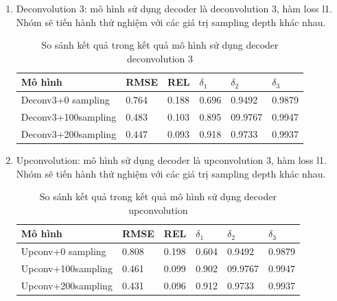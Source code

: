 \begin{enumerate}
\item Deconvolution 3: mô hình sử dụng decoder là  deconvolution 3, hàm loss l1. Nhóm sẽ tiến hành thử nghiệm với các giá trị sampling depth khác nhau. 
\begin{table}[H]
\centering
\begin{tabular}{ |p{4cm}|p{2.5cm}|p{2cm}|p{1cm}|p{1cm}|p{1cm}|   }
\hline
Mô hình & RMSE &  REL & $\delta_1$ & $\delta_2$ & $\delta_3$ \\
\hline
Deconv3+0 sampling & 0.764 & 0.188 & 0.696 & 0.9492 & 0.9879 \\
\hline
Deconv3+100sampling & 0.483 &  0.103  & 0.895 & 09.9767 & 0.9947\\
\hline
Deconv3+200sampling & 0.447 & 0.093 & 0.918 & 0.9733 & 0.9937 \\
\hline
\end{tabular}
\caption{So sánh kết quả trong kết quả mô hình sử dụng decoder deconvolution 3}
\label{tab:deconv3}
\end{table}
 
 
 \item Upconvolution: mô hình sử dụng decoder là  upconvolution 3, hàm loss l1. Nhóm sẽ tiến hành thử nghiệm với các giá trị sampling depth khác nhau. 
\begin{table}[H]
\centering
\begin{tabular}{ |p{4cm}|p{2.5cm}|p{2cm}|p{1cm}|p{1cm}|p{1cm}|   }
\hline
Mô hình & RMSE &  REL & $\delta_1$ & $\delta_2$ & $\delta_3$ \\
\hline
Upconv+0 sampling & 0.808 & 0.198 & 0.604 & 0.9492 & 0.9879 \\
\hline
Upconv+100sampling & 0.461 &  0.099  & 0.902 & 09.9767 & 0.9947\\
\hline
Upconv+200sampling & 0.431 & 0.096 & 0.912 & 0.9733 & 0.9937 \\
\hline
\end{tabular}
\caption{So sánh kết quả trong kết quả mô hình sử dụng decoder upconvolution}
\label{tab:upconv}
\end{table}
 


\end{enumerate}
